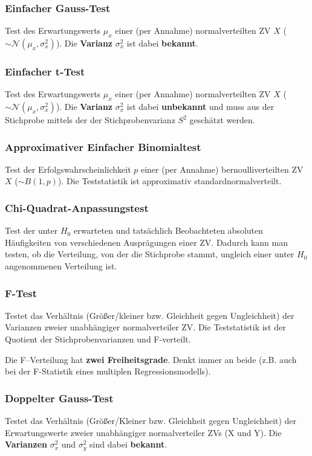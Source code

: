 \documentclass[a4paper]{article}
\newcommand\dangersign[1][2ex]{%
  \renewcommand\stacktype{L}%
  \scaleto{\stackon[1.3pt]{\color{red}$\triangle$}{\tiny !}}{#1}%
}
\begin{document}
\subsubsection{Einfacher Gauss-Test}\label{sec:Gausstest1}
Test des Erwartungswerts $\mu_x$ einer (per Annahme) normalverteilten ZV $X$ ($\sim \mathcal{N}(\mu_x, \sigma_x^2)$). Die \textbf{Varianz} $\sigma_x^2$ ist dabei \textbf{bekannt}. 

\subsubsection{Einfacher t-Test}\label{sec:tTest1}
Test des Erwartungswerts $\mu_x$ einer (per Annahme) normalverteilten ZV $X$ ($\sim \mathcal{N}(\mu_x, \sigma_x^2)$). Die \textbf{Varianz} $\sigma_x^2$ ist dabei \textbf{unbekannt} und muss aus der Stichprobe mittels der der Stichprobenvarianz $S^2$ geschätzt werden. 

\subsubsection{Approximativer Einfacher Binomialtest}\label{sec:bintest1}
Test der Erfolgswahrscheinlichkeit $p$ einer (per Annahme) bernoulliverteilten ZV $X$ ($\sim B(1, p)$). Die Teststatistik ist approximativ standardnormalverteilt. 

\subsubsection{Chi-Quadrat-Anpassungstest}\label{sec:chitest1}
Test der unter $H_0$ erwarteten und tatsächlich Beobachteten absoluten Häufigkeiten von verschiedenen Ausprägungen einer ZV. Dadurch kann man testen, ob die Verteilung, von der die Stichprobe stammt, ungleich einer unter $H_0$ angenommenen Verteilung ist.

\subsubsection{F-Test}\label{sec:ftest}
Testet das Verhältnis (Größer/kleiner bzw. Gleichheit gegen Ungleichheit) der Varianzen zweier unabhängiger normalverteiler ZV. Die Teststatistik ist der Quotient der Stichprobenvarianzen und F-verteilt.

\noindent \dangersign[3ex] Die F--Verteilung hat \textbf{zwei Freiheitsgrade}. Denkt immer an beide (z.B. auch bei der F-Statistik eines multiplen Regressionsmodells).

\subsubsection{Doppelter Gauss-Test}\label{sec:Gausstest2}
Testet das Verhältnis (Größer/Kleiner bzw. Gleichheit gegen Ungleichheit) der Erwartungswerte zweier unabhängiger normalverteiler ZVs (X und Y). Die \textbf{Varianzen} $\sigma_x^2$ und $\sigma_y^2$ sind dabei \textbf{bekannt}. 
\end{document}
